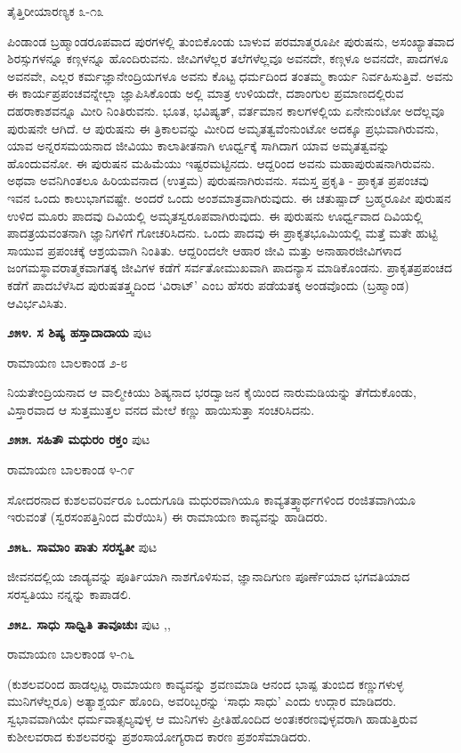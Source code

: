 {\hfill ತೈತ್ತಿರೀಯಾರಣ್ಯಕ ೩-೧೩

ಪಿಂಡಾಂಡ ಬ್ರಹ್ಮಾಂಡರೂಪವಾದ ಪುರಗಳಲ್ಲಿ ತುಂಬಿಕೊಂಡು ಬಾಳುವ ಪರಮಾತ್ಮರೂಪೀ ಪುರುಷನು, ಅಸಂಖ್ಯಾತವಾದ ಶಿರಸ್ಸುಗಳನ್ನೂ ಕಣ್ಗಳನ್ನೂ ಹೊಂದಿರುವನು. ಜೀವಿಗಳೆಲ್ಲರ ತಲೆಗಳೆಲ್ಲವೂ ಅವನದೇ, ಕಣ್ಗಳೂ ಅವನದೇ, ಪಾದಗಳೂ ಅವನವೇ, ಎಲ್ಲರ ಕರ್ಮಜ್ಞಾನೇಂದ್ರಿಯಗಳೂ ಅವನು ಕೊಟ್ಟ ಧರ್ಮದಿಂದ ತಂತಮ್ಮ ಕಾರ್ಯ ನಿರ್ವಹಿಸುತ್ತಿವೆ. ಅವನು ಈ ಕಾರ್ಯಪ್ರಪಂಚವನ್ನೇಲ್ಲಾ ಜ್ಞಾಪಿಸಿಕೊಂಡು ಅಲ್ಲಿ ಮಾತ್ರ ಉಳಿಯದೇ, ದಶಾಂಗುಲ ಪ್ರಮಾಣದಲ್ಲಿರುವ ದಹರಾಕಾಶವನ್ನೂ ಮೀರಿ ನಿಂತಿರುವನು. ಭೂತ, ಭವಿಷ್ಯತ್, ವರ್ತಮಾನ ಕಾಲಗಳಲ್ಲಿಯ ಏನೇನುಂಟೋ ಅದೆಲ್ಲವೂ ಪುರುಷನೇ ಆಗಿದೆ. ಆ ಪುರುಷನು ಈ ತ್ರಿಕಾಲವನ್ನು ಮೀರಿದ ಅಮೃತತ್ವವೆಂನುಂಟೋ ಅದಕ್ಕೂ ಪ್ರಭುವಾಗಿರುವನು, ಯಾವ ಅನ್ನರಸಮಯನಾದ ಜೀವಿಯು ಕಾಲಾತೀತನಾಗಿ ಊರ್ಧ್ವಕ್ಕೆ ಸಾಗಿದಾಗ ಯಾವ ಅಮೃತತ್ವವನ್ನು ಹೊಂದುವನೋ. ಈ ಪುರುಷನ ಮಹಿಮೆಯು ಇಷ್ಟರಮಟ್ಟಿನದು. ಆದ್ದರಿಂದ ಅವನು ಮಹಾಪುರುಷನಾಗಿರುವನು. ಅಥವಾ ಅವನಿಗಿಂತಲೂ ಹಿರಿಯವನಾದ (ಉತ್ತಮ) ಪುರುಷನಾಗಿರುವನು. ಸಮಸ್ತ ಪ್ರಕೃತಿ - ಪ್ರಾಕೃತ ಪ್ರಪಂಚವು ಇವನ ಒಂದು ಕಾಲುಭಾಗವಷ್ಟೇ. ಅಂದರೆ ಒಂದು ಅಂಶಮಾತ್ರವಾಗಿರುವುದು. ಈ ಚತುಷ್ಪಾದ್ ಬ್ರಹ್ಮರೂಪೀ ಪುರುಷನ ಉಳಿದ ಮೂರು ಪಾದವು ದಿವಿಯಲ್ಲಿ ಅಮೃತಸ್ವರೂಪವಾಗಿರುವುದು. ಈ ಪುರುಷನು ಊರ್ಧ್ವವಾದ ದಿವಿಯಲ್ಲಿ ಪಾದತ್ರಯವಂತನಾಗಿ ಜ್ಞಾನಿಗಳಿಗೆ ಗೋಚರಿಸಿದನು. ಒಂದು ಪಾದವು ಈ ಪ್ರಾಕೃತಭೂಮಿಯಲ್ಲಿ ಮತ್ತೆ ಮತೇ ಹುಟ್ಟಿ ಸಾಯುವ ಪ್ರಪಂಚಕ್ಕೆ ಆಶ್ರಯವಾಗಿ ನಿಂತಿತು. ಆದ್ದರಿಂದಲೇ ಆಹಾರ ಜೀವಿ ಮತ್ತು ಅನಾಹಾರಜೀವಿಗಳಾದ ಜಂಗಮಸ್ಥಾವರಾತ್ಮಕವಾಗತಕ್ಕ ಜೀವಿಗಳ ಕಡೆಗೆ ಸರ್ವತೋಮುಖವಾಗಿ ಪಾದನ್ಯಾಸ ಮಾಡಿಕೊಂಡನು. ಪ್ರಾಕೃತಪ್ರಪಂಚದ ಕಡೆಗೆ ಪಾದಬೆಳೆಸಿದ ಪುರುಷತತ್ತ್ವದಿಂದ `ವಿರಾಟ್' ಎಂಬ ಹೆಸರು ಪಡೆಯತಕ್ಕ ಅಂಡವೊಂದು (ಬ್ರಹ್ಮಾಂಡ) ಆವಿರ್ಭವಿಸಿತು.

\medskip
\noindent\textbf{೨೫೪. ಸ ಶಿಷ್ಯ ಹಸ್ತಾದಾದಾಯ} \hfill ಪುಟ \pageref{198}

\hfill ರಾಮಾಯಣ ಬಾಲಕಾಂಡ ೨-೮

ನಿಯತೇಂದ್ರಿಯನಾದ ಆ ವಾಲ್ಮೀಕಿಯು ಶಿಷ್ಯನಾದ ಭರದ್ವಾಜನ ಕೈಯಿಂದ ನಾರುಮಡಿಯನ್ನು ತೆಗೆದುಕೊಂಡು, ವಿಸ್ತಾರವಾದ ಆ ಸುತ್ತಮುತ್ತಲ ವನದ ಮೇಲೆ ಕಣ್ಣು ಹಾಯಿಸುತ್ತಾ ಸಂಚರಿಸಿದನು.

\medskip
\noindent\textbf{೨೫೫. ಸಹಿತೌ ಮಧುರಂ ರಕ್ತಂ} \hfill ಪುಟ \pageref{189}

\hfill ರಾಮಾಯಣ ಬಾಲಕಾಂಡ ೪-೧೯

ಸೋದರನಾದ ಕುಶಲವರಿರ್ವರೂ ಒಂದುಗೂಡಿ ಮಧುರವಾಗಿಯೂ ಕಾವ್ಯತತ್ತ್ವಾರ್ಥಗಳಿಂದ ರಂಜಿತವಾಗಿಯೂ ಇರುವಂತೆ (ಸ್ವರಸಂಪತ್ತಿನಿಂದ ಮೆರೆಯಿಸಿ) ಈ ರಾಮಾಯಣ ಕಾವ್ಯವನ್ನು ಹಾಡಿದರು.

\medskip
\noindent\textbf{೨೫೬. ಸಾಮಾಂ ಪಾತು ಸರಸ್ವತೀ} \hfill ಪುಟ \pageref{100}

\hfill ಜೀವನದಲ್ಲಿಯ ಜಾಡ್ಯವನ್ನು ಪೂರ್ತಿಯಾಗಿ ನಾಶಗೊಳಿಸುವ, ಜ್ಞಾನಾದಿಗುಣ ಪೂರ್ಣೆಯಾದ ಭಗವತಿಯಾದ ಸರಸ್ವತಿಯು ನನ್ನನ್ನು ಕಾಪಾಡಲಿ.

\medskip
\noindent\textbf{೨೫೭. ಸಾಧು ಸಾಧ್ವಿತಿ ತಾವೂಚುಃ} \hfill ಪುಟ \pageref{168},\pageref{211},\pageref{242}

\hfill ರಾಮಾಯಣ ಬಾಲಕಾಂಡ ೪-೧೬

(ಕುಶಲವರಿಂದ ಹಾಡಲ್ಪಟ್ಟ ರಾಮಾಯಣ ಕಾವ್ಯವನ್ನು ಶ್ರವಣಮಾಡಿ ಆನಂದ ಭಾಷ್ಪ ತುಂಬಿದ ಕಣ್ಣುಗಳುಳ್ಳ ಮುನಿಗಳೆಲ್ಲರೂ) ಅತ್ಯಾಶ್ಚರ್ಯ ಹೊಂದಿ, ಅವರಿಬ್ಬರನ್ನು `ಸಾಧು ಸಾಧು' ಎಂದು ಉದ್ಗಾರ ಮಾಡಿದರು. ಸ್ವಭಾವವಾಗಿಯೇ ಧರ್ಮವಾತ್ಸಲ್ಯವುಳ್ಳ ಆ ಮುನಿಗಳು ಪ್ರೀತಿಹೊಂದಿದ ಅಂತಃಕರಣವುಳ್ಳವರಾಗಿ ಹಾಡುತ್ತಿರುವ ಕುಶೀಲವರಾದ ಕುಶಲವರನ್ನು ಪ್ರಶಂಸಾಯೋಗ್ಯರಾದ ಕಾರಣ ಪ್ರಶಂಸೆಮಾಡಿದರು.

}
